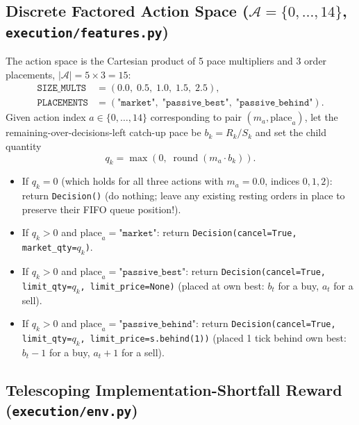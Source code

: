 \documentclass[11pt,a4paper]{article}
\newcommand{\code}[1]{\texttt{#1}}
\begin{document}
\subsection{Discrete Factored Action Space ($\mathcal{A} = \{0,\dots,14\}$, \code{execution/features.py})}

The action space is the Cartesian product of 5 pace multipliers and 3 order placements,
$|\mathcal{A}| = 5 \times 3 = 15$:
\begin{align}
  \code{SIZE\_MULTS} &= (0.0,\; 0.5,\; 1.0,\; 1.5,\; 2.5), \\
  \code{PLACEMENTS} &= (\code{"market"},\; \code{"passive\_best"},\; \code{"passive\_behind"}).
\end{align}
Given action index $a \in \{0,\dots,14\}$ corresponding to pair $(m_a, \text{place}_a)$, let the
remaining-over-decisions-left catch-up pace be $b_k = R_k / S_k$ and set the child quantity
\begin{equation}
  q_k = \max(0,\; \operatorname{round}(m_a \cdot b_k)).
\end{equation}
\begin{itemize}[nosep]
\item If $q_k = 0$ (which holds for all three actions with $m_a = 0.0$, indices $0, 1, 2$): return
  \code{Decision()} (do nothing; leave any existing resting orders in place to preserve their FIFO
  queue position!).
\item If $q_k > 0$ and $\text{place}_a = \code{"market"}$: return
  \code{Decision(cancel=True, market\_qty=$q_k$)}.
\item If $q_k > 0$ and $\text{place}_a = \code{"passive\_best"}$: return
  \code{Decision(cancel=True, limit\_qty=$q_k$, limit\_price=None)} (placed at own best: $b_t$ for a
  buy, $a_t$ for a sell).
\item If $q_k > 0$ and $\text{place}_a = \code{"passive\_behind"}$: return
  \code{Decision(cancel=True, limit\_qty=$q_k$, limit\_price=s.behind(1))} (placed 1 tick behind own
  best: $b_t - 1$ for a buy, $a_t + 1$ for a sell).
\end{itemize}

\subsection{Telescoping Implementation-Shortfall Reward (\code{execution/env.py})}
\end{document}

